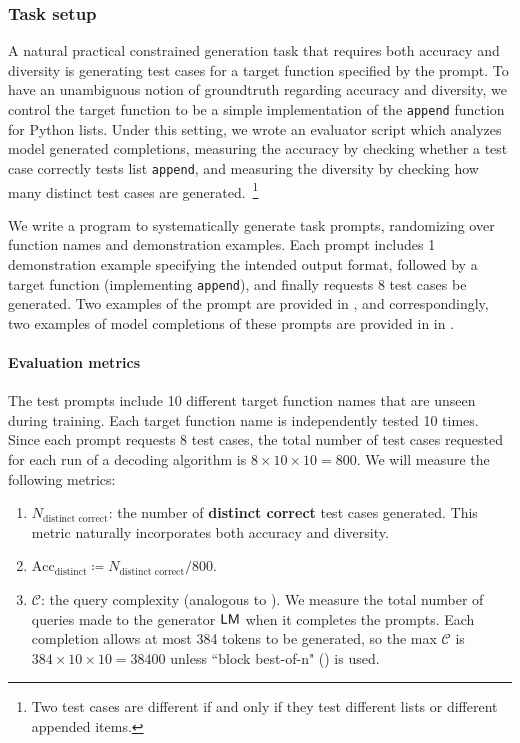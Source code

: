 \subsubsection{Task setup}
\label{sec:experiments:codellama:task}

A natural practical constrained generation task that requires both accuracy and diversity
is generating test cases for a target function specified by the prompt.
To have an unambiguous notion of groundtruth regarding accuracy and diversity,
we control the target function to be a simple implementation of the \texttt{append} function for Python lists.
Under this setting,
we wrote an evaluator script which analyzes model generated completions, 
measuring the accuracy by checking whether a test case correctly tests list \texttt{append},
and measuring the diversity by checking how many distinct test cases are generated.~\footnote{
Two test cases are different if and only if they test different lists or different appended items.
}

We write a program to systematically generate task prompts,
randomizing over function names and demonstration examples.
Each prompt includes 1 demonstration example specifying the intended output format,
followed by a target function (implementing \texttt{append}),
and finally requests 8 test cases be generated.
Two examples of the prompt are provided in ,
and correspondingly, two examples of model completions of these prompts are provided in 
in .

\paragraph{Evaluation metrics}
The test prompts include 10 different target function names that are unseen during training.
Each target function name is independently tested 10 times.
Since each prompt requests 8 test cases,
the total number of test cases requested for each run of a decoding algorithm is 
$8 \times 10 \times 10 = 800$.
We will measure the following metrics:
\begin{enumerate}
    \item $N_\text{distinct correct}$: the number of \textbf{distinct correct} test cases generated. This metric naturally incorporates both accuracy and diversity.
    \item $\text{Acc}_\text{distinct} \coloneqq N_\text{distinct correct} / 800$.
    \item $\mathcal{C}$: the query complexity (analogous to ). We measure the total number of queries made to the generator $\mathsf{LM}$ when it completes the prompts.
    Each completion allows at most 384 tokens to be generated, so the max $\mathcal{C}$ is $384 \times 10 \times 10 = 38400$ 
    unless ``block best-of-n" () is used.
\end{enumerate}

